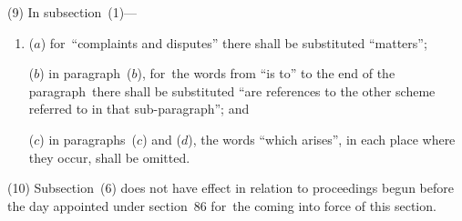 \documentclass[12pt,a4paper]{article}
\begin{document}
(9) In subsection~(1)—
\begin{enumerate}\item[]
($a$) for~“complaints and disputes” there shall be substituted “matters”;

($b$) in paragraph~($b$), for~the words from “is to” to the end of the paragraph~there shall be substituted “are references to the other scheme referred to in that sub-paragraph”; and

($c$) in paragraphs~($c$)  and ($d$), the words “which arises”, in each place where they occur, shall be omitted.
\end{enumerate}

(10) Subsection~(6)  does not have effect in relation to proceedings begun before the day appointed under section~86 for~the coming into force of this section.
\end{document}

